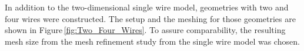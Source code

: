 In addition to the two-dimensional single wire model, geometries with two and four wires were constructed. The setup and the meshing for those geometries are shown in Figure\,\ref{fig:Two_Four_Wires}. To assure comparability, the resulting mesh size from the mesh refinement study from the single wire model was chosen.  

\begin{figure}[h]
          \begin{subfigure}{0.24\textwidth}
                  \flushleft
          \end{subfigure}\hfill	
	  \begin{subfigure}{0.24\textwidth}
                  \flushleft

\end{subfigure}
\end{figure}
